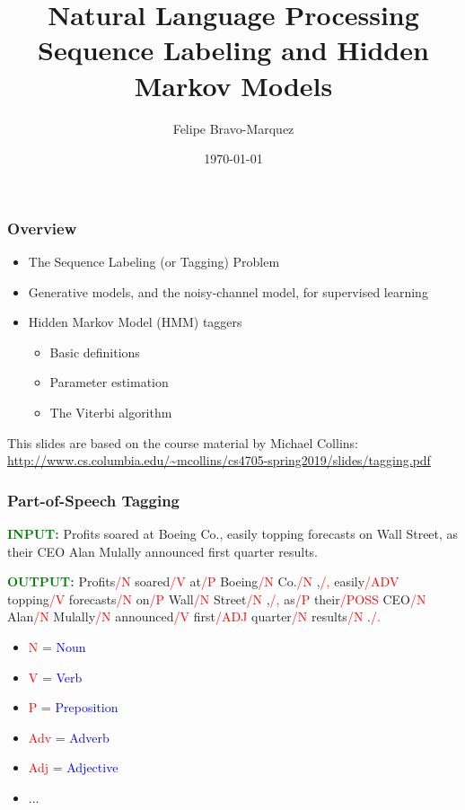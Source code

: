 \documentclass[handout]{beamer}
\title{Natural Language Processing \\ Sequence Labeling and Hidden Markov Models}
\author[Felipe Bravo Márquez]{\footnotesize
 \textcolor[rgb]{0.00,0.00,1.00}{Felipe Bravo-Marquez}}
\date{\today}
\begin{document}
\begin{frame}
\titlepage


\end{frame}



\begin{frame}
  \frametitle{Overview}
  \scriptsize
  \begin{itemize}
    \item The Sequence Labeling (or Tagging) Problem
    \item Generative models, and the noisy-channel model, for supervised learning
    \item Hidden Markov Model (HMM) taggers
    \begin{itemize}
    \item Basic definitions
    \item Parameter estimation
    \item The Viterbi algorithm
    \end{itemize}
  \end{itemize}
 This slides are based on the course material by Michael Collins: \url{http://www.cs.columbia.edu/~mcollins/cs4705-spring2019/slides/tagging.pdf}

\end{frame}

\begin{frame}
  \frametitle{Part-of-Speech Tagging}
  \scriptsize
  \textcolor{green}{\textbf{INPUT:}}
  Profits soared at Boeing Co., easily topping forecasts on Wall Street, as their CEO Alan Mulally announced first quarter results.

  \textcolor{green}{\textbf{OUTPUT:}}
  Profits\textcolor{red}{/N} soared\textcolor{red}{/V} at\textcolor{red}{/P} Boeing\textcolor{red}{/N} Co.\textcolor{red}{/N} ,\textcolor{red}{/,} easily\textcolor{red}{/ADV} topping\textcolor{red}{/V} forecasts\textcolor{red}{/N} on\textcolor{red}{/P} Wall\textcolor{red}{/N} Street\textcolor{red}{/N} ,\textcolor{red}{/,} as\textcolor{red}{/P} their\textcolor{red}{/POSS} CEO\textcolor{red}{/N} Alan\textcolor{red}{/N} Mulally\textcolor{red}{/N} announced\textcolor{red}{/V} first\textcolor{red}{/ADJ} quarter\textcolor{red}{/N} results\textcolor{red}{/N} .\textcolor{red}{/.}

  \begin{itemize}
    \item \textcolor{red}{N} = \textcolor{blue}{Noun}
    \item \textcolor{red}{V} = \textcolor{blue}{Verb}
    \item \textcolor{red}{P} = \textcolor{blue}{Preposition}
    \item \textcolor{red}{Adv} = \textcolor{blue}{Adverb}
    \item \textcolor{red}{Adj} = \textcolor{blue}{Adjective}
    \item ...
  \end{itemize}
\end{frame}
\end{document}
